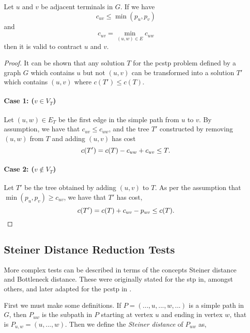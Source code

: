 \begin{theorem}
  Let $u$ and $v$ be adjacent terminals in $G$. If we have
  $$c_{uv} \leq \min(p_u, p_v)$$
  and
  $$c_{uv} = \min_{(u, w) \in E}c_{uw}$$
  then it is valid to contract $u$ and $v$.
\end{theorem}
\begin{proof}
  It can be shown that any solution $T$ for the \gls{pcstp} problem defined by a graph $G$
  which contains $u$ but not $(u,v)$ can
  be transformed into a solution $T'$ which contains $(u,v)$ where $c(T') \leq c(T)$.

  \paragraph{Case 1: ($v \in V_T$)}
  Let $(u, w) \in E_T$ be the first edge in the simple path from $u$ to $v$. By assumption, we
  have that $c_{uv} \leq c_{uw}$, and the tree $T'$ constructed by removing $(u,w)$ from $T$ and
  adding $(u,v)$ has cost
  $$c(T') = c(T) - c_{uw} + c_{uv} \leq T\mathnormal{.}$$
  \paragraph{Case 2: ($v  \not\in V_T$)}
  Let $T'$ be the tree obtained by adding $(u,v)$ to $T$. As per the assumption that $\min(p_u, p_v) \geq c_{uv}$,
  we have that $T'$ has cost,
  $$c(T') = c(T) + c_{uv} - p_{uv} \leq c(T)\mathnormal{.}$$
\end{proof}


\subsection{Steiner Distance Reduction Tests}\label{sec:sd-red-test}
More complex tests can be described in terms
of the concepts Steiner distance and Bottleneck distance. These were originally stated for
the \gls{stp} in, amongst others, \cite{duin1989edge,duin1989reduction} and later
adapted for the \gls{pcstp} in \cite{uchoa2006reduction}.

First we must make some definitions.
If $P = (..., u, ..., w, ...)$ is a simple path in $G$, then $P_{uw}$ is
the subpath in $P$ starting at vertex $u$ and ending in vertex $w$,
that is $P_{u,w} = (u, ...,w)$. Then we define the \textit{Steiner distance} of
 $P_{uw}$ as,

